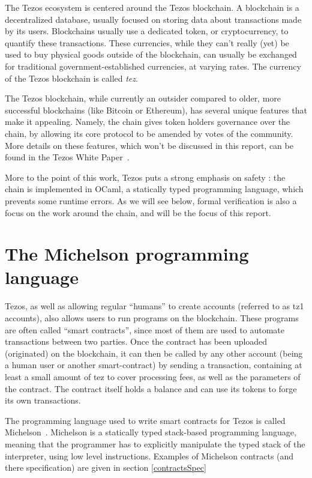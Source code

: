 \documentclass{report}
\begin{document}
The Tezos ecosystem is centered around the Tezos blockchain. A blockchain is a decentralized database, usually focused on storing data about transactions made by its users. Blockchains usually use a dedicated token, or cryptocurrency, to quantify these transactions. These currencies, while they can't really (yet) be used to buy physical goods outside of the blockchain, can usually be exchanged for traditional government-established currencies, at varying rates. The currency of the Tezos blockchain is called \emph{tez}.

The Tezos blockchain, while currently an outsider compared to older, more successful blockchains (like Bitcoin or Ethereum), has several unique features that make it appealing. Namely, the chain gives token holders governance over the chain, by allowing its core protocol to be amended by votes of the community. More details on these features, which won't be discussed in this report, can be found in the Tezos White Paper~\cite{whitePaper}.

More to the point of this work, Tezos puts a strong emphasis on safety : the chain is implemented in OCaml, a statically typed programming language, which prevents some runtime errors. As we will see below, formal verification is also a focus on the work around the chain, and will be the focus of this report.

\section{The Michelson programming language}

Tezos, as well as allowing regular ``humans'' to create accounts (referred to as tz1 accounts), also allows users to run programs on the blockchain. These programs are often called ``smart contracts'', since most of them are used to automate transactions between two parties. Once the contract has been uploaded (originated) on the blockchain, it can then be called by any other account (being a human user or another smart-contract) by sending a transaction, containing at least a small amount of tez to cover processing fees, as well as the parameters of the contract. The contract itself holds a balance and can use its tokens to forge its own transactions.

The programming language used to write smart contracts for Tezos is called Michelson~\cite{michelsonwhitedoc}. Michelson is a statically typed stack-based programming language, meaning that the programmer has to explicitly manipulate the typed stack of the interpreter, using low level instructions. Examples of Michelson contracts (and there specification) are given in section \ref{contractsSpec}
\end{document}

